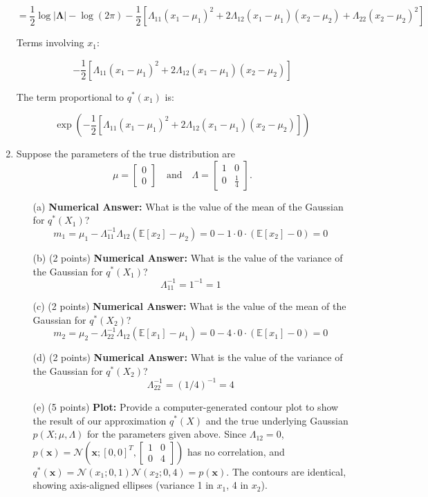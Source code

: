 \documentclass[a3paper,12pt]{extarticle} %
\begin{document}
\begin{enumerate}
\[
= \frac{1}{2} \log |\boldsymbol{\Lambda}| - \log (2\pi) - \frac{1}{2} \left[ \Lambda_{11} (x_1 - \mu_1)^2 + 2 \Lambda_{12} (x_1 - \mu_1)(x_2 - \mu_2) + \Lambda_{22} (x_2 - \mu_2)^2 \right]
\]

Terms involving \(x_1\):

\[
-\frac{1}{2} \left[ \Lambda_{11} (x_1 - \mu_1)^2 + 2 \Lambda_{12} (x_1 - \mu_1)(x_2 - \mu_2) \right]
\]

The term proportional to \(q^*(x_1)\) is:

\[
\exp\left( -\frac{1}{2} \left[ \Lambda_{11} (x_1 - \mu_1)^2 + 2 \Lambda_{12} (x_1 - \mu_1)(x_2 - \mu_2) \right] \right)
\]

    \item Suppose the parameters of the true distribution are 
    \[
    \mu = 
    \begin{bmatrix}
    0 \\
    0
    \end{bmatrix}
    \quad \text{and} \quad
    \Lambda = 
    \begin{bmatrix}
    1 & 0 \\
    0 & \frac{1}{4}
    \end{bmatrix}.
    \]
        \begin{enumerate}
            \item[(a)] \textbf{Numerical Answer:} What is the value of the mean of the Gaussian for \( q^*(X_1) \)?
\[
m_1 = \mu_1 - \Lambda_{11}^{-1} \Lambda_{12} (\mathbb{E}[x_2] - \mu_2) = 0 - 1 \cdot 0 \cdot (\mathbb{E}[x_2] - 0) = 0
\]
            \item[(b)] (2 points) \textbf{Numerical Answer:} What is the value of the variance of the Gaussian for \( q^*(X_1) \)?
\[
\Lambda_{11}^{-1} = 1^{-1} = 1
\]
            \item[(c)] (2 points) \textbf{Numerical Answer:} What is the value of the mean of the Gaussian for \( q^*(X_2) \)?
            \[
m_2 = \mu_2 - \Lambda_{22}^{-1} \Lambda_{12} (\mathbb{E}[x_1] - \mu_1) = 0 - 4 \cdot 0 \cdot (\mathbb{E}[x_1] - 0) = 0
\]
            \item[(d)] (2 points) \textbf{Numerical Answer:} What is the value of the variance of the Gaussian for \( q^*(X_2) \)?
\[
\Lambda_{22}^{-1} = (1/4)^{-1} = 4
\]
            \item[(e)] (5 points) \textbf{Plot:} Provide a computer-generated contour plot to show the result of our approximation \( q^*(X) \) and the true underlying Gaussian \( p(X; \mu, \Lambda) \) for the parameters given above.
            Since \(\Lambda_{12} = 0\), \(p(\mathbf{x}) = \mathcal{N}(\mathbf{x}; [0,0]^T, \begin{bmatrix} 1 & 0 \\ 0 & 4 \end{bmatrix})\) has no correlation, and \(q^*(\mathbf{x}) = \mathcal{N}(x_1; 0, 1) \mathcal{N}(x_2; 0, 4) = p(\mathbf{x})\). The contours are identical, showing axis-aligned ellipses (variance 1 in \(x_1\), 4 in \(x_2\)).


\end{enumerate}
\end{enumerate}
\end{document}
